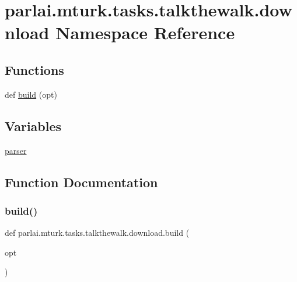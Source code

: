 \hypertarget{namespaceparlai_1_1mturk_1_1tasks_1_1talkthewalk_1_1download}{}\section{parlai.\+mturk.\+tasks.\+talkthewalk.\+download Namespace Reference}
\label{namespaceparlai_1_1mturk_1_1tasks_1_1talkthewalk_1_1download}
\subsection*{Functions}
\begin{DoxyCompactItemize}
\item 
def \hyperlink{namespaceparlai_1_1mturk_1_1tasks_1_1talkthewalk_1_1download_a8c0fbb9b6dfe127cb8c1bd6e7c4e33fd}{build} (opt)
\end{DoxyCompactItemize}
\subsection*{Variables}
\begin{DoxyCompactItemize}
\item 
\hyperlink{namespaceparlai_1_1mturk_1_1tasks_1_1talkthewalk_1_1download_afc57e8bd20e5008ba31cf55a9d35df81}{parser}
\end{DoxyCompactItemize}


\subsection{Function Documentation}
\mbox{\label{namespaceparlai_1_1mturk_1_1tasks_1_1talkthewalk_1_1download_a8c0fbb9b6dfe127cb8c1bd6e7c4e33fd}} 
\subsubsection{\texorpdfstring{build()}{build()}}
{\footnotesize\ttfamily def parlai.\+mturk.\+tasks.\+talkthewalk.\+download.\+build (\begin{DoxyParamCaption}\item[{}]{opt }\end{DoxyParamCaption})}



